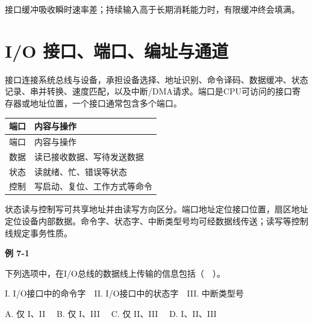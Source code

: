 接口缓冲吸收瞬时速率差；持续输入高于长期消耗能力时，有限缓冲终会填满。

\section{I/O 接口、端口、编址与通道}\label{CO07-ports}

接口连接系统总线与设备，承担设备选择、地址识别、命令译码、数据缓冲、状态记录、串并转换、速度匹配，以及中断/DMA请求。端口是CPU可访问的接口寄存器或地址位置，一个接口通常包含多个端口。

\par\smallskip
{\fontsize{9.3}{12}\selectfont\setlength{\tabcolsep}{2.5pt}\setlength{\LTleft}{0pt}\setlength{\LTright}{0pt}
\begin{longtable}{@{}>{\raggedright\arraybackslash}p{}>{\raggedright\arraybackslash}p{}@{}}
\toprule
端口 & 内容与操作 \\

\midrule\endfirsthead\toprule
端口 & 内容与操作 \\

\midrule\endhead\bottomrule\endfoot
数据 & 读已接收数据、写待发送数据 \\

状态 & 读就绪、忙、错误等状态 \\

控制 & 写启动、复位、工作方式等命令 \\

\end{longtable}}
\par\smallskip

状态读与控制写可共享地址并由读写方向区分。端口地址定位接口位置，扇区地址定位设备内部数据。命令字、状态字、中断类型号均可经数据线传送；读写等控制线规定事务性质。

\par\medskip{}\noindent\hypertarget{CO07-E01}{}\label{CO07-E01}\textbf{例 7-1}\par\nobreak\smallskip

下列选项中，在I/O总线的数据线上传输的信息包括（　）。

I. I/O接口中的命令字　II. I/O接口中的状态字　III. 中断类型号

A. 仅 I、II　 B. 仅 I、III　 C. 仅 II、III　 D. I、II、III

